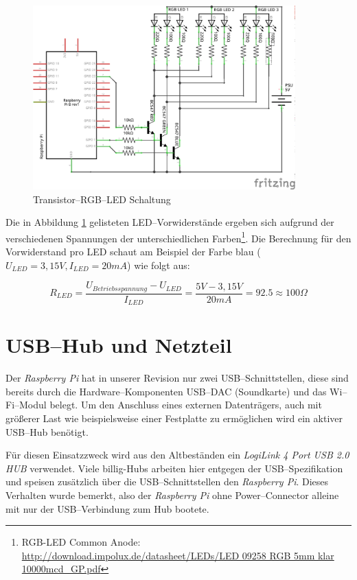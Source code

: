 \documentclass[11pt,ngerman,toc=listof,index=totoc]{scrreprt}
\begin{document}
\begin{figure}[h!]
  \centering
\includegraphics[width=0.9\textwidth]{images/transistorled.png}
  \caption{Transistor--RGB--LED Schaltung}
  \label{transled}
\end{figure}

Die in Abbildung \ref{transled} gelisteten LED--Vorwiderstände ergeben
sich aufgrund der verschiedenen Spannungen der unterschiedlichen
Farben\footnote{RGB-LED Common Anode:
  \url{http://download.impolux.de/datasheet/LEDs/LED 09258 RGB 5mm klar 10000mcd_GP.pdf}}.
Die Berechnung für den Vorwiderstand pro LED schaut am Beispiel der
Farbe blau (\(U_{LED} = 3,15V, I_{LED} = 20mA\)) wie folgt aus:

\[R_{LED} = \frac{U_{Betriebsspannung} - U_{LED}}{I_{LED}} = \frac{5V - 3,15V}{20mA} =92.5 \approx 100\Omega\]

\section{USB--Hub und Netzteil}\label{usbhub-und-netzteil}

Der \emph{Raspberry Pi} hat in unserer Revision nur zwei
USB--Schnittstellen, diese sind bereits durch die Hardware--Komponenten
USB--DAC (Soundkarte) und das Wi--Fi--Modul belegt. Um den Anschluss
eines externen Datenträgers, auch mit größerer Last wie beispielsweise
einer Festplatte zu ermöglichen wird ein aktiver USB--Hub benötigt.

Für diesen Einsatzzweck wird aus den Altbeständen ein \emph{LogiLink 4
Port USB 2.0 HUB} verwendet. Viele billig-Hubs arbeiten hier entgegen
der USB--Spezifikation und speisen zusätzlich über die
USB--Schnittstellen den \emph{Raspberry Pi}. Dieses Verhalten wurde
bemerkt, also der \emph{Raspberry Pi} ohne Power--Connector alleine mit
nur der USB--Verbindung zum Hub bootete.
\end{document}
